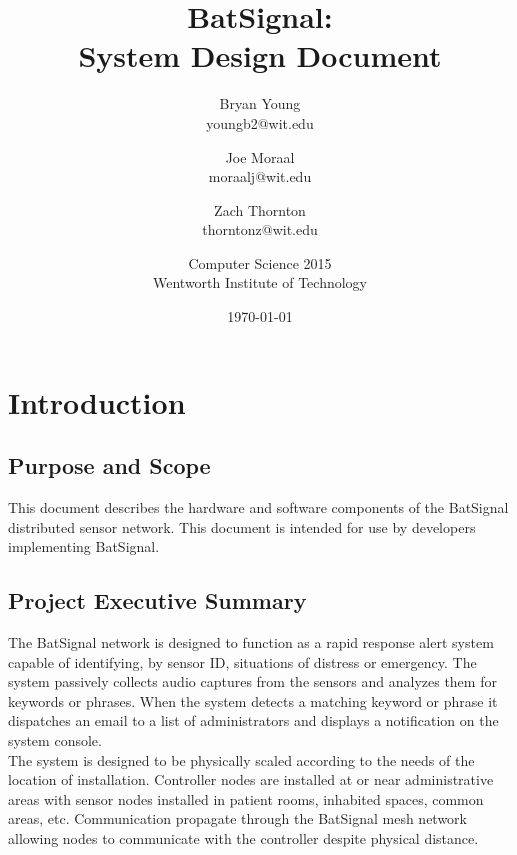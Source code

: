 \documentclass[11pt,a4paper]{article}
\begin{document}
\title{BatSignal:\\System Design Document}
\author{
	Bryan Young\\youngb2@wit.edu \and
	Joe Moraal\\moraalj@wit.edu\\ \and
	Zach Thornton\\thorntonz@wit.edu \and
	Computer Science 2015 \\
	Wentworth Institute of Technology
}
\date{\today}

\maketitle
\newpage

\tableofcontents{}
\newpage


\section{Introduction}

\subsection{Purpose and Scope}
\textnormal{This document describes the hardware and software components of the BatSignal distributed sensor network. This document is intended for use by developers implementing BatSignal.}

\subsection{Project Executive Summary}
\textnormal{The BatSignal network is designed to function as a rapid response alert system capable of identifying, by sensor ID, situations of distress or emergency. The system passively collects audio captures from the sensors and analyzes them for keywords or phrases. When the system detects a matching keyword or phrase it dispatches an email to a list of administrators and displays a notification on the system console. \\
The system is designed to be physically scaled according to the needs of the location of installation. Controller nodes are installed at or near administrative areas with sensor nodes installed in patient rooms, inhabited spaces, common areas, etc. Communication propagate through the BatSignal mesh network allowing nodes to communicate with the controller despite physical distance.}
\end{document}
